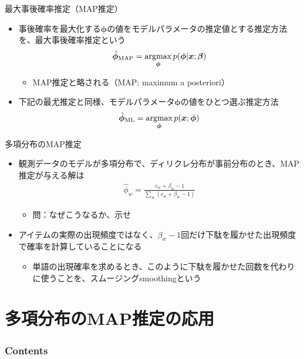 \documentclass[aspectratio=169,unicode,dvipdfmx,14pt]{beamer}
\begin{document}
\begin{frame}{最大事後確率推定（MAP推定）}
\begin{itemize}
\item 事後確率を最大化する$\bm{\phi}$の値をモデルパラメータの推定値とする推定方法を、最大事後確率推定という
\begin{align}
\hat{\bm{\phi}}_{\mbox{\scriptsize MAP}} = \operatorname*{argmax}_{\bm{\phi}} p(\bm{\phi}|\bm{x};\bm{\beta})
\end{align}
\begin{itemize}
\item MAP推定と略される（MAP; maximum a posteriori）
\end{itemize}
\item 下記の最尤推定と同様、モデルパラメータ$\bm{\phi}$の値をひとつ選ぶ推定方法
\begin{align}
\hat{\bm{\phi}}_{\mbox{\scriptsize ML}} = \operatorname*{argmax}_{\bm{\phi}} p(\bm{x};\bm{\phi})
\end{align}
\end{itemize}
\end{frame}

\begin{frame}{多項分布のMAP推定}
\begin{itemize}
\item 観測データのモデルが多項分布で、ディリクレ分布が事前分布のとき、MAP推定が与える解は
\begin{align}
\hat{\phi}_w = \frac{c_w + \beta_w - 1}{\sum_w (c_w + \beta_w - 1)} 
\end{align}
\begin{itemize}
\item 問：なぜこうなるか、示せ
\end{itemize}
\item アイテムの実際の出現頻度ではなく、$\beta_w - 1$回だけ下駄を履かせた出現頻度で確率を計算していることになる
\begin{itemize}
\item 単語の出現確率を求めるとき、このように下駄を履かせた回数を代わりに使うことを、スムージングsmoothingという
\end{itemize}
\end{itemize}
\end{frame}


\section{多項分布のMAP推定の応用}

\begin{frame}\frametitle{Contents}
\Large \tableofcontents[currentsection]
\end{frame}
\end{document}

